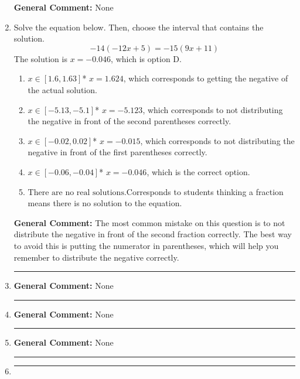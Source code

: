 \documentclass{extbook}[14pt]
\newcommand{\litem}[1]{\item#1\hspace*{-1cm}\rule{\textwidth}{0.4pt}}
\begin{document}
\begin{enumerate}
{\textbf{General Comment:} None
}
\litem{
Solve the equation below. Then, choose the interval that contains the solution.
\[ -14(-12x + 5) = -15(9x + 11) \]
The solution is \( x = -0.046 \), which is option D.\begin{enumerate}[label=\Alph*.]
\item \( x \in [1.6, 1.63] \)* $x = 1.624$, which corresponds to getting the negative of the actual solution.
\item \( x \in [-5.13, -5.1] \)* $x = -5.123$, which corresponds to not distributing the negative in front of the second parentheses correctly.
\item \( x \in [-0.02, 0.02] \)* $x = -0.015$, which corresponds to not distributing the negative in front of the first parentheses correctly.
\item \( x \in [-0.06, -0.04] \)* $x = -0.046$, which is the correct option.
\item \( \text{There are no real solutions.} \)Corresponds to students thinking a fraction means there is no solution to the equation.
\end{enumerate}

\textbf{General Comment:} The most common mistake on this question is to not distribute the negative in front of the second fraction correctly. The best way to avoid this is putting the numerator in parentheses, which will help you remember to distribute the negative correctly.
}
\litem{



\textbf{General Comment:} None
}
\litem{



\textbf{General Comment:} None
}
\litem{



\textbf{General Comment:} None
}
\litem{



}
\end{enumerate}
\end{document}

